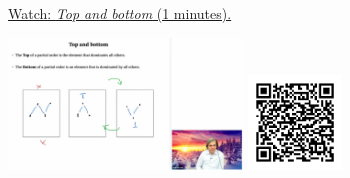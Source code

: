 
\begin{minipage}{10cm}
    \href{https://act4e-spring21.netlify.app/videos/spring2021-tradeoffs:tradeoffs:orders:top-bottom.html}{Watch: \emph{Top and bottom} (1 minutes).}
        
    \href{https://act4e-spring21.netlify.app/videos/spring2021-tradeoffs:tradeoffs:orders:top-bottom.html}{\includegraphics[height=3.5cm]{spring2021-tradeoffs:tradeoffs:orders:top-bottom/thumbnails.jpg}}
    \href{https://act4e-spring21.netlify.app/videos/spring2021-tradeoffs:tradeoffs:orders:top-bottom.html}{\includegraphics[height=2.5cm]{spring2021-tradeoffs:tradeoffs:orders:top-bottom/qrcode.png}}
\end{minipage}
